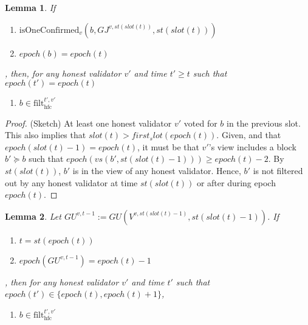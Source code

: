 \documentclass{article}
\newtheorem{lemma}{Lemma}
\begin{document}
\begin{lemma}
    If
    \begin{enumerate}
        \item $\text{isOneConfirmed}_v(b, GJ^{v,st(slot(t))}, st(slot(t)))$
        \item $epoch(b) = epoch(t)$
    \end{enumerate},
    then, for any honest validator $v'$ and time $t' \geq t$ such that $epoch(t') = epoch(t)$
    \begin{enumerate}
        \item $b \in \text{filt}^{t',v'}_{\text{hfc}}$
    \end{enumerate}
\end{lemma}

\begin{proof}(Sketch)
    At least one honest validator $v'$ voted for $b$ in the previous slot.
    This also implies that $slot(t) > first_slot(epoch(t))$. 
    Given,  and that $epoch(slot(t)-1) = epoch(t)$,  it must be that $v'$'s view includes a block $b' \succeq b$ such that $epoch(vs(b', st(slot(t)-1))) \geq epoch(t)-2$.
    By $st(slot(t))$, $b'$ is in the view of any honest validator.
    Hence, $b'$ is not filtered out by any honest validator at time $st(slot(t))$ or after during epoch $epoch(t)$.
\end{proof}

\begin{lemma}
    Let $GU^{v,t-1} := GU(V^{v,st(slot(t)-1)},st(slot(t)-1))$.
    If
    \begin{enumerate}
        \item $t = st(epoch(t))$
        \item $epoch(GU^{v,t-1}) = epoch(t)-1$
    \end{enumerate},
    then for any honest validator $v'$ and time $t'$ such that $epoch(t') \in \{epoch(t),epoch(t)+1\}$,
    \begin{enumerate}
        \item $b \in \text{filt}^{t',v'}_{\text{hfc}}$
    \end{enumerate}
\end{lemma}
\end{document}
